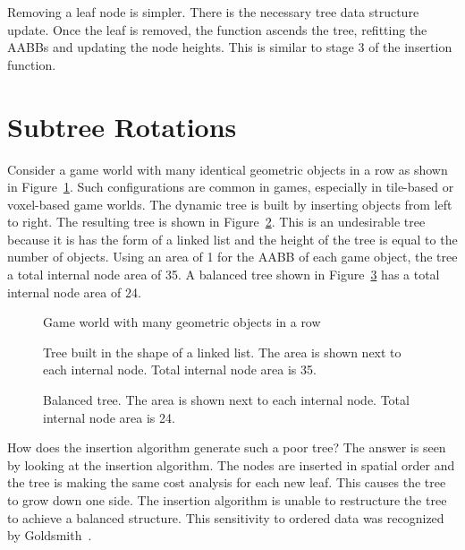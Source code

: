 \documentclass{article}
\begin{document}
Removing a leaf node is simpler. There is the necessary tree data structure update. Once the leaf is removed, the function ascends the tree, refitting the AABBs and updating the node heights. This is similar to stage 3 of the insertion function.

\section{Subtree Rotations}

Consider a game world with many identical geometric objects in a row as shown in Figure~\ref{fig:tile_based}. Such configurations are common in games, especially in tile-based or voxel-based game worlds. The dynamic tree is built by inserting objects from left to right. The resulting tree is shown in Figure~\ref{fig:linked_list}. This is an undesirable tree because it is has the form of a linked list and the height of the tree is equal to the number of objects. Using an area of 1 for the AABB of each game object, the tree a total internal node area of 35. A balanced tree shown in Figure~\ref{fig:balanced} has a total internal node area of 24.

\begin{figure}
	\begin{center}
		
	\end{center}
	\caption{Game world with many geometric objects in a row}
	\label{fig:tile_based}
\end{figure}

\begin{figure}
	\begin{center}
		
	\end{center}
	\caption{Tree built in the shape of a linked list. The area is shown next to each internal node. Total internal node area is 35. }
	\label{fig:linked_list}
\end{figure}

\begin{figure}
	\begin{center}
		
	\end{center}
	\caption{Balanced tree. The area is shown next to each internal node. Total internal node area is 24. }
	\label{fig:balanced}
\end{figure}

How does the insertion algorithm generate such a poor tree? The answer is seen by looking at the insertion algorithm. The nodes are inserted in spatial order and the tree is making the same cost analysis for each new leaf. This causes the tree to grow down one side. The insertion algorithm is unable to restructure the tree to achieve a balanced structure. This sensitivity to ordered data was recognized by Goldsmith~\cite{Goldsmith1987}.
\end{document}

